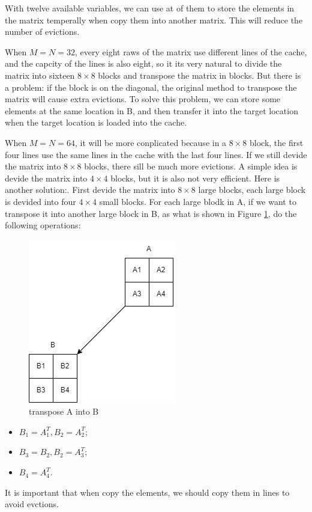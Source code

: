 \documentclass{article}
\begin{document}
With twelve available variables, we can use at of them to store the elements in the matrix temperally when copy them into another matrix. This will reduce the number of evictions.

When $M = N = 32$, every eight raws of the matrix use different lines of the cache, and the capcity of the lines is also eight, so it its very natural to divide the matrix into sixteen $8 \times 8$ blocks and transpose the matrix in blocks. But there is a problem: if the block is on the diagonal, the original method to transpose the matrix will cause extra evictions. To solve this problem, we can store some elements at the same location in B, and then transfer it into the target location when the target location is loaded into the cache.

When $M = N = 64$, it will be more conplicated because in a $8 \times 8$ block, the first four lines use the same lines in the cache with the last four lines. If we still devide the matrix into $8 \times 8$ blocks, there sill be much more evictions. A simple idea is devide the matrix into $4 \times 4$ blocks, but it is also not very efficient. Here is another solution:. First devide the matrix into $8 \times 8$ large blocks, each large block is devided into four $4 \times 4$ small blocks. For each large blodk in A, if we want to transpose it into another large block in B, as what is shown in Figure \ref{fig:2}, do the following operations:

\begin{figure}[htbp]
    \centering
    \includegraphics[width = 0.3\linewidth]{blocks.png}
    \caption{transpose A into B}\label{fig:2}
\end{figure}

\begin{itemize}
    \item $B_1 = A_1^T, B_2 = A_2^T$;
    \item $B_3 = B_2, B_2 = A_3^T$;
    \item $B_4 = A_4^T$.
\end{itemize}

It is important that when copy the elements, we should copy them in lines  to avoid evctions.
\end{document}
